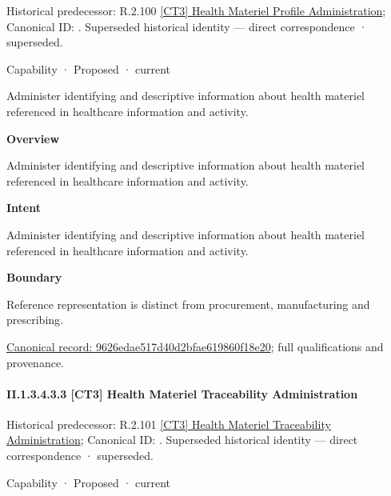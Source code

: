 {\small Historical predecessor: R.2.100 \hyperref[element:9216f9cc905e4526b1d98cd4ab382cbf]{[CT3] Health Materiel Profile Administration}; Canonical ID: \texttt{}. Superseded historical identity — direct correspondence · superseded.}\par
\label{element:9626edae517d40d2bfae619860f18e20}
{\small Capability · Proposed · current}\par

Administer identifying and descriptive information about health materiel referenced in healthcare information and activity.



\textbf{Overview}



Administer identifying and descriptive information about health materiel referenced in healthcare information and activity.



\textbf{Intent}



Administer identifying and descriptive information about health materiel referenced in healthcare information and activity.



\textbf{Boundary}



Reference representation is distinct from procurement, manufacturing and prescribing.


{\footnotesize \href{../../../../../../../continuum/strategy/capability/9626edae517d40d2bfae619860f18e20.md}{Canonical record: 9626edae517d40d2bfae619860f18e20}; full qualifications and provenance.}\par
\paragraph*{II.1.3.4.3.3 [CT3] Health Materiel Traceability Administration}
\label{navigation:II.1.3.4.3.3}

{\small Historical predecessor: R.2.101 \hyperref[element:f1b888e8d50c4019ac1afe162d6223f3]{[CT3] Health Materiel Traceability Administration}; Canonical ID: \texttt{}. Superseded historical identity — direct correspondence · superseded.}\par
\label{element:2d41ed0f00a94a4b90ffe87d6fd4e9fe}
{\small Capability · Proposed · current}\par

